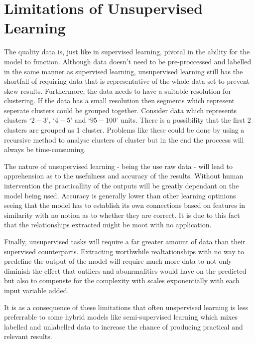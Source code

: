\documentclass[10pt,a4paper]{report}
\begin{document}
			\section{Limitations of Unsupervised Learning}
				The quality data is, just like in supervised learning, pivotal in the ability for the model to function. Although data
				doesn't need to be pre-proccessed and labelled in the same manner as supervised learning, unsupervised learning
				still has the shortfall of requiring data that is representative of the whole data set to prevent skew results. Furthermore,
				the data needs to have a suitable resolution for clustering. If the data has a small resolution then segments which represent seperate clusters could be
				grouped together. Consider data which represents clusters `$2-3$', `$4-5$' and `$95-100$' units. There is a possibility that the first 2 clusters are grouped as 1 cluster.
				Problems like these could be done by using a recursive method to analyse clusters of cluster but in the end the proccess will always be time-consuming. \par
				The nature of unsupervised learning - being the use raw data - will lead to apprehension as to the usefulness and accuracy of the results. Without human intervention the
				practicallity of the outputs will be greatly dependant on the model being used. Accuracy is generally lower than other learning optinions seeing that the model has to
				establish its own connections based on features in similarity with no notion as to whether they are correct. It is due to this fact that the relationships extracted might be
				moot with no application. \par
				Finally, unsupervised tasks will require a far greater amount of data than their supervised counterparts. Extracting worthwhile realtationships with no way to predefine the output
				of the model will require much more data to not only diminish the effect that outliers and abonrmalities would have on the predicted but also to compenste for the complexity with scales
				exponentially with each input variable added. \par
				It is as a consequence of these limitations that often unspervised learning is less preferrable to some hybrid models like semi-supervised learning which mixes labelled and unlabelled data
				to increase the chance of producing practical and relevant results.
\end{document}
